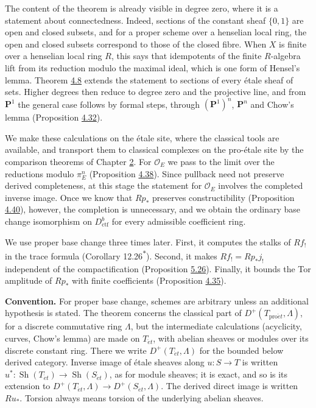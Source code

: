 \documentclass[11pt]{article}
\newcommand{\bpout}[1]{#1\textsuperscript{\hyperlink{bp-outside}{\ensuremath{\ast}}}}
\providecommand{\Sh}{}\renewcommand{\Sh}{\operatorname{Sh}}
\begin{document}
The content of the theorem is already visible in degree zero, where it is a statement about connectedness. Indeed, sections of the constant sheaf \(\{0,1\}\) are open and closed subsets, and for a proper scheme over a henselian local ring, the open and closed subsets correspond to those of the closed fibre. When \(X\) is finite over a henselian local ring \(R\), this says that idempotents of the finite \(R\)-algebra lift from its reduction modulo the maximal ideal, which is one form of Hensel's lemma. Theorem \hyperref[bp308]{4.8} extends the statement to sections of every étale sheaf of sets. Higher degrees then reduce to degree zero and the projective line, and from \(\mathbf P^1\) the general case follows by formal steps, through \((\mathbf P^1)^n\), \(\mathbf P^n\) and Chow's lemma (Proposition \hyperref[bp378]{4.32}).

We make these calculations on the étale site, where the classical tools are available, and transport them to classical complexes on the pro-étale site by the comparison theorems of Chapter \hyperref[bp3]{2}. For \(\mathcal O_E\) we pass to the limit over the reductions modulo \(\pi_E^n\) (Proposition \hyperref[bp397]{4.38}). Since pullback need not preserve derived completeness, at this stage the statement for \(\mathcal O_E\) involves the completed inverse image. Once we know that \(Rp_*\) preserves constructibility (Proposition \hyperref[bp405]{4.40}), however, the completion is unnecessary, and we obtain the ordinary base change isomorphism on \(D^b_{\mathrm{ctf}}\) for every admissible coefficient ring.

We use proper base change three times later. First, it computes the stalks of \(Rf_!\) in the trace formula (Corollary \bpout{12.26}). Second, it makes \(Rf_!=Rp_*j_!\) independent of the compactification (Proposition \hyperref[bp492]{5.26}). Finally, it bounds the Tor amplitude of \(Rp_*\) with finite coefficients (Proposition \hyperref[bp390]{4.35}).

\label{bp289}%
\textbf{Convention.} For proper base change, schemes are arbitrary unless an additional hypothesis is stated. The theorem concerns the classical part of \(D^+(T_{\mathrm{pro}\acute{e}t},\Lambda)\), for a discrete commutative ring \(\Lambda\), but the intermediate calculations (acyclicity, curves, Chow's lemma) are made on \(T_{\acute{e}t}\), with abelian sheaves or modules over its discrete constant ring. There we write \(D^+(T_{\acute{e}t},\Lambda)\) for the bounded below derived category. Inverse image of étale sheaves along \(u:S\to T\) is written \(u^*:\Sh(T_{\acute{e}t})\to\Sh(S_{\acute{e}t})\), as for module sheaves; it is exact, and so is its extension to \(D^+(T_{\acute{e}t},\Lambda)\to D^+(S_{\acute{e}t},\Lambda)\). The derived direct image is written \(Ru_*\). Torsion always means torsion of the underlying abelian sheaves.
\end{document}
